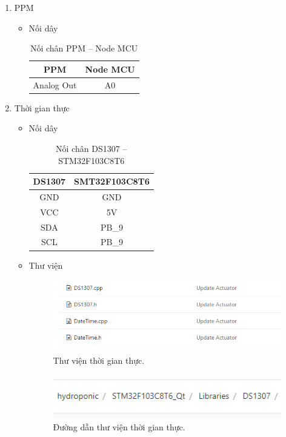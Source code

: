 \documentclass[a4paper,12pt,oneside]{article}
\begin{document}
\begin{enumerate}
	\item PPM
	\begin{itemize}
		\item Nối dây

		\begin{table}[!htp]
    	\centering
			\begin{tabular}{|c|c|}
			\hline 
		 	PPM & Node MCU \\ 
			\hline 
			Analog Out & A0 \\ 
			\hline 
			\end{tabular} 
		\caption{Nối chân PPM – Node MCU}
		\end{table}
		
		
	\end{itemize}
	
	\item Thời gian thực
	\begin{itemize}
		\item Nối dây
		\begin{table}[!htp]
    	\centering
		\begin{tabular}{|c|c|}
		\hline 
		DS1307 & SMT32F103C8T6 \\ 
		\hline 
		GND & GND \\ 
		\hline 
		VCC & 5V \\ 
		\hline 
		SDA & PB\_9 \\ 
		\hline 
		SCL & PB\_9 \\ 
		\hline 
		\end{tabular} 
    	\caption{Nối chân DS1307 – STM32F103C8T6}
		\end{table}
		
		\item Thư viện
			\begin{figure}[H]
			\centering
			\includegraphics[scale=.7]{hinh/lib_realtime.PNG}
			\caption{Thư viện thời gian thực.}
			\end{figure}
			
			\begin{figure}[H]
			\centering
			\includegraphics[scale=.7]{hinh/path_realtime.PNG}
			\caption{Đường dẫn thư viện thời gian thực.}
			\end{figure}		
		

\end{itemize}
\end{enumerate}
\end{document}
